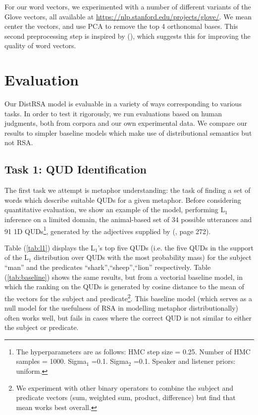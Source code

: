 \documentclass[10pt,letterpaper,twocolumn]{article}
\begin{document}
For our word vectors, we experimented with a number of different variants of the Glove vectors, all available at \url{https://nlp.stanford.edu/projects/glove/}. We mean center the vectors, and use PCA to remove the top 4 orthonomal bases. This second preprocessing step is inspired by (\cite{mu2016geometry}), which suggests this for improving the quality of word vectors.




\section{Evaluation}

Our DistRSA model is evaluable in a variety of ways corresponding to various tasks. In order to test it rigorously, we run evaluations based on human judgments, both from corpora and our own experimental data. We compare our results to simpler baseline models which make use of distributional semantics but not RSA.

\subsection{Task 1: QUD Identification} \label{task1id}


The first task we attempt is metaphor understanding: the task of finding a set of words which describe suitable QUDs for a given metaphor. Before considering quantitative evaluation, we show an example of the model, performing L$_1$ inference on a limited domain, the animal-based set of 34 possible utterances and 91 1D QUDs\footnote{The hyperparameters are as follows: HMC step size = 0.25. Number of HMC samples = 1000. Sigma$_1$ =0.1. Sigma$_2$ =0.1. Speaker and listener priors: uniform.}, generated by the adjectives supplied by (\cite{kao}, page 272). 

Table (\ref{tab:l1}) displays the L$_1$'s top five QUDs (i.e. the five QUDs in the support of the L$_1$ distribution over QUDs with the most probability mass) for the subject ``man'' and the predicates ``shark'',``sheep'',``lion'' respectively. Table (\ref{tab:baseline}) shows the same results, but from a vectorial baseline model, in which the ranking on the QUDs is generated by cosine distance to the mean of the vectors for the subject and predicate\footnote{We experiment with other binary operators to combine the subject and predicate vectors (sum, weighted sum, product, difference) but find that mean works best overall.}. This baseline model (which serves as a null model for the usefulness of RSA in modelling metaphor distributionally) often works well, but fails in cases where the correct QUD is not similar to either the subject or predicate. 
\end{document}
